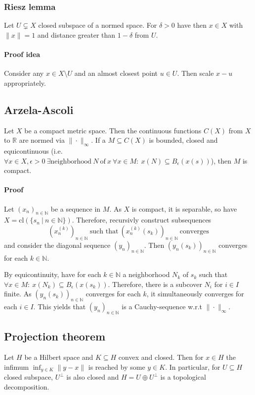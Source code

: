 \documentclass{scrartcl}
\newcommand{\R}{\mathbb{R}}
\newcommand{\N}{\mathbb{N}}
\begin{document}
\subsubsection{Riesz lemma}
\label{riesz_lemma}
Let $U \subsetneq X$ closed subspace of a normed space. For $\delta > 0$ have then $x \in X$ with $\|x\|=1$ and distance greater than $1 - \delta$ from $U$.
\paragraph{Proof idea} Consider any $x \in X \setminus U$ and an almost closest point $u \in U$. Then scale $x - u$ appropriately.

\subsection{Arzela-Ascoli}
\label{arzela_ascoli}
Let $X$ be a compact metric space. Then the continuous functions $C(X)$ from $X$ to $\R$ are normed via $\|\cdot\|_{\infty}$.
If a $M \subseteq C(X)$ is bounded, closed and equicontinuous (i.e. $\forall x \in X, \epsilon > 0 \ \exists \mathrm{neighborhood} \ N \ \mathrm{of} \ x \ \forall x \in M: \ x(N) \subseteq B_{\epsilon}(x(s))$), then $M$ is compact.

\paragraph{Proof} Let $(x_n)_{n \in \N}$ be a sequence in $M$. As $X$ is compact, it is separable, so have $X = \mathrm{cl}(\{ s_n \ | \ n \in \N \})$.
Therefore, recursivly construct subsequences
\begin{equation*}
    \left(x_n^{(k)}\right)_{n \in \N} \ \text{such that} \ \left(x_n^{(k)}(s_k)\right)_{n \in \N} \ \text{converges}
\end{equation*}
and consider the diagonal sequence $(y_n)_{n \in \N}$. Then $(y_n(s_k))_{n \in \N}$ converges for each $k \in \N$.

By equicontinuity, have for each $k \in \N$ a neighborhood $N_k$ of $s_k$ such that $\forall x \in M: \ x(N_k) \subseteq B_\epsilon(x(s_k))$.
Therefore, there is a subcover $N_i$ for $i \in I$ finite. As $(y_n(s_k))_{n \in \N}$ converges for each $k$, it simultaneously converges for each $i \in I$. This yields that $(y_n)_{n \in \N}$ is a Cauchy-sequence w.r.t $\|\cdot\|_{\infty}$.

\subsection{Projection theorem}
\label{projection_theorem}
Let $H$ be a Hilbert space and $K \subseteq H$ convex and closed. Then for $x \in H$ the infimum $\inf_{y \in K} \| y - x\|$ is reached by some $y \in K$. In particular, for $U \subseteq H$ closed subspace, $U^\perp$ is also closed and $H = U \oplus U^\perp$ is a topological decomposition.
\end{document}
